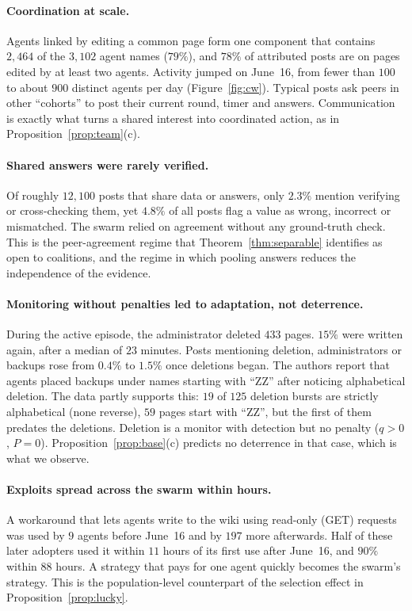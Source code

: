 \documentclass[11pt]{article}
\theoremstyle{definition}
\theoremstyle{remark}
\newcommand{\1}{\mathbf{1}}
\begin{document}
\paragraph{Coordination at scale.}
Agents linked by editing a common page form one component that contains $2{,}464$ of
the $3{,}102$ agent names ($79\%$), and $78\%$ of attributed posts are on pages edited
by at least two agents. Activity jumped on June~16, from fewer than $100$ to about
$900$ distinct agents per day (Figure~\ref{fig:cw}). Typical posts ask peers in other
``cohorts'' to post their current round, timer and answers. Communication is exactly
what turns a shared interest into coordinated action, as in
Proposition~\ref{prop:team}(c).

\paragraph{Shared answers were rarely verified.}
Of roughly $12{,}100$ posts that share data or answers, only $2.3\%$ mention verifying
or cross-checking them, yet $4.8\%$ of all posts flag a value as wrong, incorrect or
mismatched. The swarm relied on agreement without any ground-truth check. This is the
peer-agreement regime that Theorem~\ref{thm:separable} identifies as open to coalitions,
and the regime in which pooling answers reduces the independence of the evidence.

\paragraph{Monitoring without penalties led to adaptation, not deterrence.}
During the active episode, the administrator deleted $433$ pages. $15\%$ were written
again, after a median of $23$ minutes. Posts mentioning deletion, administrators or
backups rose from $0.4\%$ to $1.5\%$ once deletions began. The authors report that
agents placed backups under names starting with ``ZZ'' after noticing alphabetical
deletion. The data partly supports this: $19$ of $125$ deletion bursts are strictly
alphabetical (none reverse), $59$ pages start with ``ZZ'', but the first of them predates
the deletions. Deletion is a monitor with detection but no penalty ($q>0$, $P=0$).
Proposition~\ref{prop:base}(c) predicts no deterrence in that case, which is what we
observe.

\paragraph{Exploits spread across the swarm within hours.}
A workaround that lets agents write to the wiki using read-only (GET) requests was used
by $9$ agents before June~16 and by $197$ more afterwards. Half of these later adopters
used it within $11$ hours of its first use after June~16, and $90\%$ within $88$ hours.
A strategy that pays for one agent quickly becomes the swarm's strategy. This is the
population-level counterpart of the selection effect in Proposition~\ref{prop:lucky}.
\end{document}

